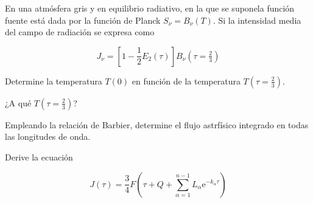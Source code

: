 \documentclass[10pt,spanish,a4paper]{practice}
\begin{document}
    \begin{problem}
        En una atmósfera gris y en equilibrio radiativo, en la que se suponela función fuente está dada por la función de Planck $S_\nu = B_\nu\left(T\right)$. Si la intensidad media del campo de radiación se expresa como

        $$
            J_{\nu} = \left[1 - \frac{1}{2}E_{2}\left(\tau\right)\right]B_{\nu}\left(\tau=\tfrac{2}{3}\right)
        $$

        \begin{problempart}
            Determine la temperatura $T(0)$ en función de la temperatura $T(\tau=\frac{2}{3})$.
        \end{problempart}

        \begin{problempart}
            ¿A qué $T(\tau=\frac{2}{3})$?
        \end{problempart}

        \begin{problempart}
            Empleando la relación de Barbier, determine el flujo astrfísico integrado en todas las longitudes de onda.
        \end{problempart}
    \end{problem}

    \begin{problem}
        Derive la ecuación

        $$
            J\left(\tau\right) = \frac{3}{4}F\left(\tau + Q + \sum_{\alpha=1}^{n-1}L_{\alpha}\mathrm{e}^{-k_{\alpha}\tau}\right)
        $$
    \end{problem}
\end{document}
